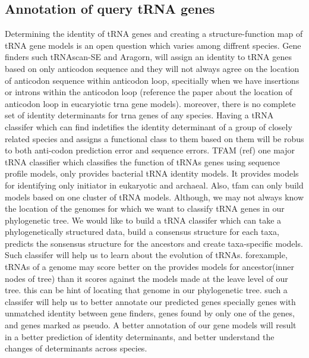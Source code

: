 \documentclass[
10pt, %
a4paper, %
oneside, %
headinclude,footinclude, %
BCOR5mm, %
]{scrartcl}
\begin{document}
\subsection{Annotation of query tRNA genes}
Determining the identity of tRNA genes and creating a structure-function map of tRNA gene models is an open question which varies among diffrent species. Gene finders such tRNAscan-SE and Aragorn, will assign an identity to tRNA genes based on only anticodon sequence and they will not always agree on the location of anticodon sequence within anticodon loop, specitially when we have insertions or introns within the anticodon loop (reference the paper about the location of anticodon loop in eucaryiotic trna gene models). moreover, there is no complete set of identity determinants for trna genes of any species. Having a tRNA classifer which can find indetifies the identity determinant of a group of closely related species and assigns a functional class to them based on them will be robus to both anti-codon prediction error and sequence errors. TFAM (ref) one major tRNA classifier which classifies the function of tRNAs genes using sequence profile models, only provides bacterial tRNA identity models. It provides models for identifying only initiator in eukaryotic and archaeal. Also, tfam can only build models based on one cluster of tRNA models. Although, we may not always know the location of the genomes for which we want to classify tRNA genes in our phylogenetic tree. We would like to build a tRNA classifer which can take a phylogenetically structured data, build a consensus structure for each taxa, predicts the sonsensus structure for the ancestors and create taxa-specific models. Such classifer will help us to learn about the evolution of tRNAs. forexample, tRNAs of a genome may score better on the provides models for ancestor(inner nodes of tree) than it scores against the models made at the leave level of our tree. this can be hint of locating that genome in our phylogenetic tree.
such a classifer will help us to better annotate our predicted genes specially genes with unmatched identity between gene finders, genes found by only one of the genes, and genes marked as pseudo. A better annotation of our gene models will result in a better prediction of identity determinants, and better understand the changes of determinants across species. 
\end{document}
